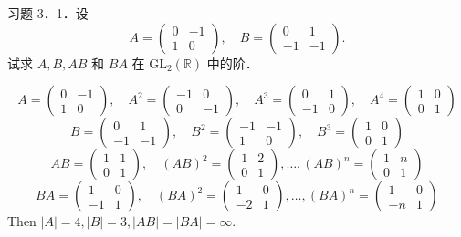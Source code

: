 \begin{exercise}
习题 3．1．设
\[
A=\left(\begin{array}{cc}
0 & -1 \\
1 & 0
\end{array}\right), \quad B=\left(\begin{array}{cc}
0 & 1 \\
-1 & -1
\end{array}\right) .
\]试求 $A, B, A B$ 和 $B A$ 在 $\mathrm{GL}_2(\mathbb{R})$ 中的阶．
\end{exercise}
\[
A=\begin{pmatrix}
0 & -1  \\
1 & 0 
\end{pmatrix},\quad A^{2}=\begin{pmatrix}
-1 & 0 \\
0 & -1
\end{pmatrix},\quad A^{3}=\begin{pmatrix}
0 & 1 \\
-1 & 0
\end{pmatrix},\quad A^{4}=\begin{pmatrix}
1 & 0 \\
0 & 1
\end{pmatrix}
\]
\[
B=\begin{pmatrix}
0 & 1 \\
-1 & -1
\end{pmatrix},\quad B^{2}=\begin{pmatrix}
-1 & -1 \\
1 &  0
\end{pmatrix},\quad B^{3}=\begin{pmatrix}
1 & 0 \\
0 & 1
\end{pmatrix}
\]
\[
AB=\begin{pmatrix}
1 & 1 \\
0 & 1
\end{pmatrix},\quad (AB)^{2}=\begin{pmatrix}
1 & 2  \\
0 & 1
\end{pmatrix},\dots,(AB)^{n}=\begin{pmatrix}
1 & n  \\
0 & 1
\end{pmatrix}
\]
\[
BA=\begin{pmatrix}
1 & 0 \\
-1 & 1
\end{pmatrix},\quad (BA)^{2}=\begin{pmatrix}
1 & 0 \\
-2 & 1
\end{pmatrix},\dots,(BA)^{n}=\begin{pmatrix}
1 & 0 \\
-n & 1
\end{pmatrix}
\]
Then $\lvert A \rvert=4,\lvert B \rvert=3,\lvert AB \rvert=\lvert BA \rvert=\infty$.

